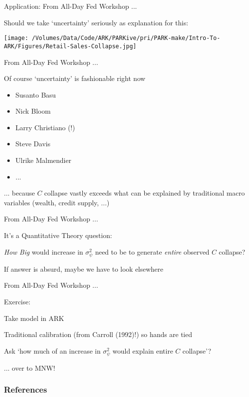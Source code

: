 \documentclass[public]{beamer}
\begin{document}
\begin{frame}{Application: From All-Day Fed Workshop ...}

Should we take `uncertainty' seriously as explanation for this:

\begin{center}
\texttt{[image: /Volumes/Data/Code/ARK/PARKive/pri/PARK-make/Intro-To-ARK/Figures/Retail-Sales-Collapse.jpg]}
\end{center}
  
\end{frame}

\begin{frame}{From All-Day Fed Workshop ...}

  Of course `uncertainty' is fashionable right now
  \begin{itemize} \pause
    \item Susanto Basu
  \item Nick Bloom
    \item Larry Christiano (!)
  \item Steve Davis
  \item Ulrike Malmendier
    \item ...
    \end{itemize}

\pause    ... because $C$ collapse vastly exceeds what can be explained by traditional macro variables (wealth, credit supply, ...)
    
\end{frame}

\begin{frame}{From All-Day Fed Workshop ...}

  It's a Quantitative Theory question:
  \bi
\item {\it How Big} would increase in $\sigma_{\psi}^{2}$ need to be to generate {\it entire} observed $C$ collapse?
  \ei

  \pause
  \bi
  \item If answer is absurd, maybe we have to look elsewhere
  \ei
  
\end{frame}

\begin{frame}{From All-Day Fed Workshop ...}

  Exercise: 
  
  \bi
\item Take \cite{cstwMPC} model in ARK
  \item Traditional calibration (from Carroll (1992)!) so hands are tied
  \item Ask `how much of an increase in $\sigma^{2}_{\psi}$ would explain entire $C$ collapse'?
  \ei

\pause ... over to MNW!  
  
\end{frame}

\beamerdefaultoverlayspecification{<*>}

\begin{frame}[t,allowframebreaks]
\frametitle{References}
\tiny 

\end{frame}
\pagebreak
\end{document}
